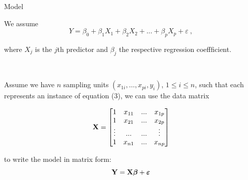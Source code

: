 \documentclass[
  10pt,
  ignorenonframetext,
]{beamer}
\begin{document}
\begin{frame}
\begin{block}{Model}
\protect\hypertarget{model}{}
\(~\)

We assume \begin{equation}
Y = \beta_0 + \beta_{1}  X_1 + \beta_2 X_2 + ... + \beta_p X_p + \varepsilon \ ,
\end{equation}

where \(X_j\) is the \(j\)th predictor and \(\beta_j\) the respective
regression coeffficient.

\(~\)

Assume we have \(n\) sampling units \((x_{1i},\ldots,x_{pi}, y_i)\),
\(1\leq i \leq n\), such that each represents an instance of equation
(3), we can use the data matrix

\[{\bf{X}} = \left[\begin{matrix} 1 & x_{11} & ... & x_{1p} \\
1 & x_{21} & ... & x_{2p} \\
\vdots  & ... & ... & \vdots \\
1 & x_{n1} & ... & x_{np} \\
\end{matrix}\right]\]

to write the model in matrix form:
\[{\bf Y}={\bf {X}} \boldsymbol{\beta}+{\boldsymbol{\varepsilon}} \]
\end{block}
\end{frame}
\end{document}
